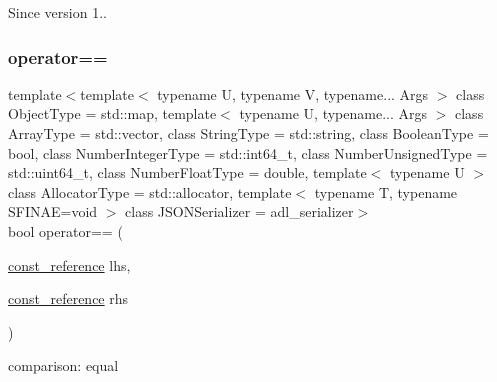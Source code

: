\begin{DoxySince}{Since}
version 1.. 
\end{DoxySince}
\mbox{\label{classnlohmann_1_1basic__json_a122640e7e2db1814fc7bbb3c122ec76e}} 
\subsubsection{\texorpdfstring{operator==}{operator==}\hspace{0.1cm}{\footnotesize\ttfamily [1/3]}}
{\footnotesize\ttfamily template$<$template$<$ typename U, typename V, typename... Args $>$ class Object\+Type = std\+::map, template$<$ typename U, typename... Args $>$ class Array\+Type = std\+::vector, class String\+Type  = std\+::string, class Boolean\+Type  = bool, class Number\+Integer\+Type  = std\+::int64\+\_\+t, class Number\+Unsigned\+Type  = std\+::uint64\+\_\+t, class Number\+Float\+Type  = double, template$<$ typename U $>$ class Allocator\+Type = std\+::allocator, template$<$ typename T, typename S\+F\+I\+N\+A\+E=void $>$ class J\+S\+O\+N\+Serializer = adl\+\_\+serializer$>$ \\
bool operator== (\begin{DoxyParamCaption}\item[{\mbox{\hyperlink{classnlohmann_1_1basic__json_a4057c5425f4faacfe39a8046871786ca}{const\+\_\+reference}}}]{lhs,  }\item[{\mbox{\hyperlink{classnlohmann_1_1basic__json_a4057c5425f4faacfe39a8046871786ca}{const\+\_\+reference}}}]{rhs }\end{DoxyParamCaption})\hspace{0.3cm}{\ttfamily [friend]}}



comparison\+: equal 

